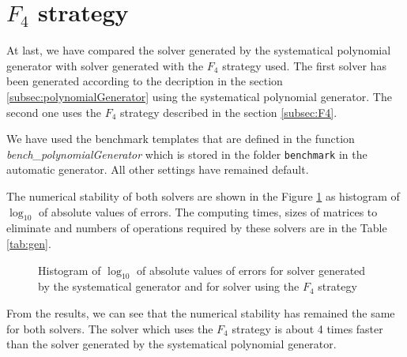 \section{$F_4$ strategy}
\label{exp:gen}
At last, we have compared the solver generated by the systematical polynomial generator with solver generated with the $F_4$ strategy used. The first solver has been generated according to the decription in the section \ref{subsec:polynomialGenerator} using the systematical polynomial generator. The second one uses the $F_4$ strategy described in the section \ref{subsec:F4}.

We have used the benchmark templates that are defined in the function \textit{bench\_poly\-nomialGenerator} which is stored in the folder \texttt{benchmark} in the automatic generator. All other settings have remained default.

The numerical stability of both solvers are shown in the Figure \ref{graph:gen} as histogram of $\log_{10}$ of absolute values of errors. The computing times, sizes of matrices to eliminate and numbers of operations required by these solvers are in the Table \ref{tab:gen}.

\begin{figure}[ht]
  \centering
  \resizebox{0.95\textwidth}{!}{}
  \caption{Histogram of $\log_{10}$ of absolute values of errors for solver generated by the systematical generator and for solver using the $F_4$ strategy}
  \label{graph:gen}
\end{figure}

From the results, we can see that the numerical stability has remained the same for both solvers. The solver which uses the $F_4$ strategy is about 4 times faster than the solver generated by the systematical polynomial generator.

